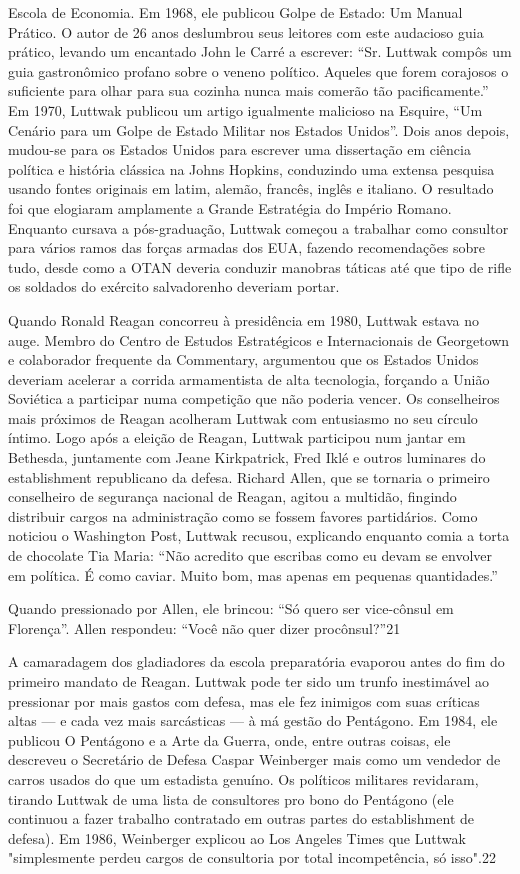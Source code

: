 Escola de Economia. Em 1968, ele publicou Golpe de Estado: Um Manual Prático. O autor de {\color{blue}26} anos deslumbrou seus leitores com este audacioso guia prático, levando um encantado John le Carré a escrever: “Sr. Luttwak compôs um guia gastronômico profano sobre o veneno político. Aqueles que forem corajosos o suficiente para olhar para sua cozinha nunca mais comerão tão pacificamente.” Em 1970, Luttwak publicou um artigo igualmente malicioso na Esquire, “Um Cenário para um Golpe de Estado Militar nos Estados Unidos”. Dois anos depois, mudou-se para os Estados Unidos para escrever uma dissertação em ciência política e história clássica na Johns Hopkins, conduzindo uma extensa pesquisa usando fontes originais em latim, alemão, francês, inglês e italiano. O resultado foi que elogiaram amplamente a Grande Estratégia do Império Romano. Enquanto cursava a pós-graduação, Luttwak começou a trabalhar como consultor para vários ramos das forças armadas dos EUA, fazendo recomendações sobre tudo, desde como a OTAN deveria conduzir manobras táticas até que tipo de rifle os soldados do exército salvadorenho deveriam portar.
 \par 
Quando Ronald Reagan concorreu à presidência em 1980, Luttwak estava no auge. Membro do Centro de Estudos Estratégicos e Internacionais de Georgetown e colaborador frequente da Commentary, argumentou que os Estados Unidos deveriam acelerar a corrida armamentista de alta tecnologia, forçando a União Soviética a participar numa competição que não poderia vencer. Os conselheiros mais próximos de Reagan acolheram Luttwak com entusiasmo no seu círculo íntimo. Logo após a eleição de Reagan, Luttwak participou num jantar em Bethesda, juntamente com Jeane Kirkpatrick, Fred Iklé e outros luminares do establishment republicano da defesa. Richard Allen, que se tornaria o primeiro conselheiro de segurança nacional de Reagan, agitou a multidão, fingindo distribuir cargos na administração como se fossem favores partidários. Como noticiou o Washington Post, Luttwak recusou, explicando enquanto comia a torta de chocolate Tia Maria: “Não acredito que escribas como eu devam se envolver em política. É como caviar. Muito bom, mas apenas em pequenas quantidades.”
 \par 
Quando pressionado por Allen, ele brincou: “Só quero ser vice-cônsul em Florença”. Allen respondeu: “Você não quer dizer procônsul?”{\color{blue}21}
 \par 
A camaradagem dos gladiadores da escola preparatória evaporou antes do fim do primeiro mandato de Reagan. Luttwak pode ter sido um trunfo inestimável ao pressionar por mais gastos com defesa, mas ele fez inimigos com suas críticas altas — e cada vez mais sarcásticas — à má gestão do Pentágono. Em 1984, ele publicou O Pentágono e a Arte da Guerra, onde, entre outras coisas, ele descreveu o Secretário de Defesa Caspar Weinberger mais como um vendedor de carros usados ​​do que um estadista genuíno. Os políticos militares revidaram, tirando Luttwak de uma lista de consultores pro bono do Pentágono (ele continuou a fazer trabalho contratado em outras partes do establishment de defesa). Em 1986, Weinberger explicou ao Los Angeles Times que Luttwak "simplesmente perdeu cargos de consultoria por total incompetência, só isso".{\color{blue}22}
